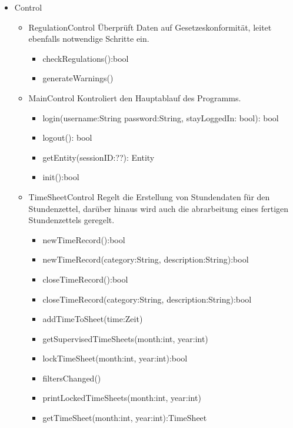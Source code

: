         \begin{itemize}
            \item{Control}
                \begin{itemize}
                    \item{RegulationControl}
                       Überprüft Daten auf Gesetzeskonformität, leitet ebenfalls notwendige Schritte ein.
                       \begin{itemize}
                           \item{checkRegulations():bool}
                           \item{generateWarnings()}
                       \end{itemize}

                    \item{MainControl}
                        Kontroliert den Hauptablauf des Programms.
                        \begin{itemize}
                             \item{login(username:String password:String,  stayLoggedIn: bool): bool}
                             \item{logout(): bool}
                             \item{getEntity(sessionID:??): Entity}
                             \item{init():bool}
                        \end{itemize}

                    \item{TimeSheetControl}
                        Regelt die Erstellung von Stundendaten für den Stundenzettel, darüber hinaus wird auch die abrarbeitung eines fertigen Stundenzettels geregelt.
                        \begin{itemize}
                             \item{newTimeRecord():bool}
                             \item{newTimeRecord(category:String, description:String):bool}
                             \item{closeTimeRecord():bool}
                             \item{closeTimeRecord(category:String, description:String):bool}
                             \item{addTimeToSheet(time:Zeit)}
                             \item{getSupervisedTimeSheets(month:int, year:int)}
                             \item{lockTimeSheet(month:int, year:int):bool}
                             \item{filtersChanged()}
                             \item{printLockedTimeSheets(month:int, year:int)}
                             \item{getTimeSheet(month:int, year:int):TimeSheet}
                        \end{itemize}


\end{itemize}
\end{itemize}
